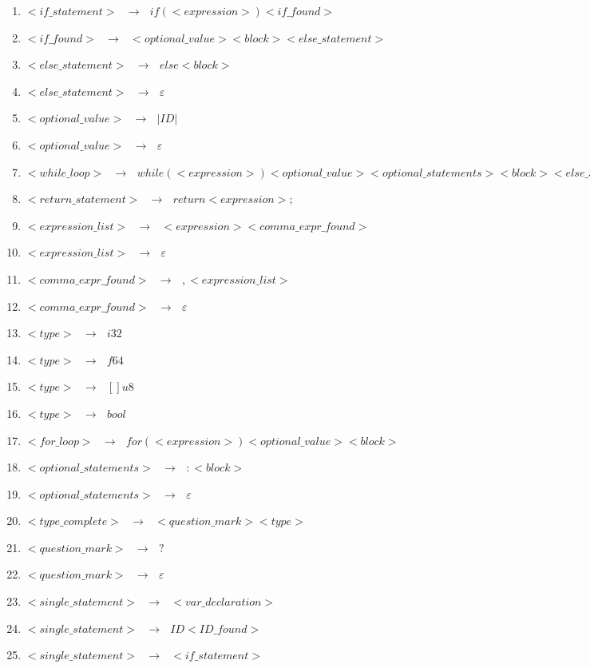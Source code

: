 \documentclass[12pt]{article}
\begin{document}
\begin{enumerate}
\item $<if\_statement> \text{ }\to \text{ } if ( <expression> ) <if\_found>$
\item $<if\_found> \text{ }\to \text{ } <optional\_value> <block> <else\_statement>$
\item $<else\_statement> \text{ }\to \text{ } else <block>$
\item $<else\_statement> \text{ }\to \text{ } \varepsilon$
\item $<optional\_value> \text{ }\to \text{ } | ID |$
\item $<optional\_value> \text{ }\to \text{ } \varepsilon$
\item $<while\_loop> \text{ }\to \text{ } while ( <expression> ) <optional\_value> <optional\_statements> <block> <else\_statement>$
\item $<return\_statement> \text{ }\to \text{ } return <expression> ;$
\item $<expression\_list> \text{ }\to \text{ } <expression> <comma\_expr\_found>$
\item $<expression\_list> \text{ }\to \text{ } \varepsilon$
\item $<comma\_expr\_found> \text{ }\to \text{ } , <expression\_list>$ 
\item $<comma\_expr\_found> \text{ }\to \text{ } \varepsilon$
\item $<type> \text{ }\to \text{ } i32$
\item $<type> \text{ }\to \text{ } f64$
\item $<type> \text{ }\to \text{ } [] u8$
\item $<type> \text{ }\to \text{ } bool$
\item $<for\_loop> \text{ }\to \text{ } for ( <expression> ) <optional\_value> <block>$
\item $<optional\_statements> \text{ }\to \text{ } : <block>$ 
\item $<optional\_statements> \text{ }\to \text{ } \varepsilon$
\item $<type\_complete> \text{ }\to \text{ } <question\_mark> <type>$
\item $<question\_mark> \text{ }\to \text{ } ?$
\item $<question\_mark> \text{ }\to \text{ } \varepsilon$
\item $ <single\_statement> \text{ }\to \text{ } <var\_declaration>$
\item $ <single\_statement> \text{ }\to \text{ } ID <ID\_found>$
\item $ <single\_statement> \text{ }\to \text{ } <if\_statement>$

\end{enumerate}
\end{document}
